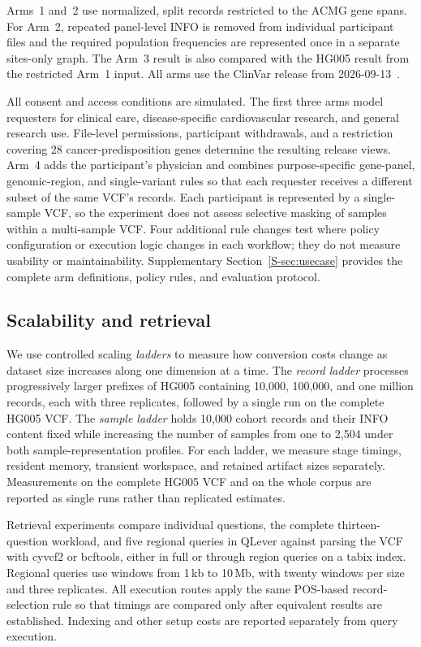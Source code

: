 \documentclass[pdflatex,sn-mathphys-num]{sn-jnl}
\begin{document}
Arms~1 and~2 use normalized, split records restricted to the ACMG gene spans.
For Arm~2, repeated panel-level INFO is removed from individual participant files and the required population frequencies are represented once in a separate sites-only graph.
The Arm~3 result is also compared with the HG005 result from the restricted Arm~1 input.
All arms use the ClinVar release from 2026-09-13~\cite{clinvar_vcf}.

All consent and access conditions are simulated.
The first three arms model requesters for clinical care, disease-specific cardiovascular research, and general research use.
File-level permissions, participant withdrawals, and a restriction covering 28 cancer-predisposition genes determine the resulting release views.
Arm~4 adds the participant's physician and combines purpose-specific gene-panel, genomic-region, and single-variant rules so that each requester receives a different subset of the same VCF's records.
Each participant is represented by a single-sample VCF, so the experiment does not assess selective masking of samples within a multi-sample VCF.
Four additional rule changes test where policy configuration or execution logic changes in each workflow; they do not measure usability or maintainability.
Supplementary Section~\ref{S-sec:usecase} provides the complete arm definitions, policy rules, and evaluation protocol.

\subsection{Scalability and retrieval}\label{subsec:eval-scalability}
We use controlled scaling \emph{ladders} to measure how conversion costs change as dataset size increases along one dimension at a time.
The \emph{record ladder} processes progressively larger prefixes of HG005 containing 10,000, 100,000, and one million records, each with three replicates, followed by a single run on the complete HG005 VCF.
The \emph{sample ladder} holds 10,000 cohort records and their INFO content fixed while increasing the number of samples from one to 2,504 under both sample-representation profiles.
For each ladder, we measure stage timings, resident memory, transient workspace, and retained artifact sizes separately.
Measurements on the complete HG005 VCF and on the whole corpus are reported as single runs rather than replicated estimates.

Retrieval experiments compare individual questions, the complete thirteen-question workload, and five regional queries in QLever against parsing the VCF with cyvcf2 or bcftools, either in full or through region queries on a tabix index.
Regional queries use windows from 1\,kb to 10\,Mb, with twenty windows per size and three replicates.
All execution routes apply the same POS-based record-selection rule so that timings are compared only after equivalent results are established.
Indexing and other setup costs are reported separately from query execution.
\end{document}
